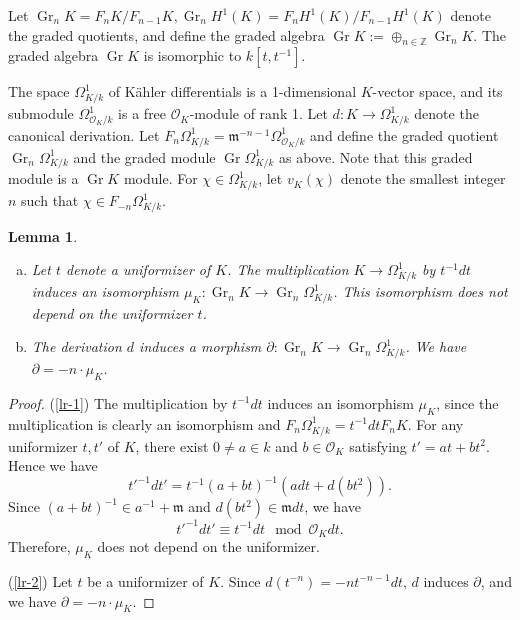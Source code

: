 \documentclass[10pt,a4paper]{amsart}
\numberwithin{equation}{section}
\newcommand{\Gr}{\operatorname{Gr}}
\theoremstyle{plain}
\newtheorem{lemm}[theo]{Lemma}
\theoremstyle{definition}
\begin{document}
Let $\Gr_nK=F_nK/F_{n-1}K,\Gr_nH^1(K)=F_nH^1(K)/F_{n-1}H^1(K)$ denote the graded quotients, and define the graded algebra $\Gr K:=\oplus_{n\in\mathbb{Z}}\Gr_nK$. The graded algebra $\Gr K$ is isomorphic to $k[t,t^{-1}]$.

The space $\Omega_{K/k}^1$ of K\"ahler differentials is a 1-dimensional $K$-vector space, and its submodule $\Omega_{\mathcal{O}_K/k}^1$ is a free $\mathcal{O}_K$-module of rank 1. Let $d:K\to\Omega_{K/k}^1$ denote the canonical derivation. Let $F_n\Omega_{K/k}^1=\mathfrak{m}^{-n-1}\Omega_{\mathcal{O}_K/k}^1$ and define the graded quotient $\Gr_n\Omega_{K/k}^1$ and the graded module $\Gr\Omega_{K/k}^1$ as above. Note that this graded module is a $\Gr K$ module. For $\chi\in \Omega_{K/k}^1$, let  $v_K(\chi)$ denote the smallest integer $n$ such that $\chi\in F_{-n}\Omega_{K/k}^1$.\\

\begin{lemm}\label{lr}
\begin{enumerate}[(a)]
 \item\label{lr-1} Let $t$ denote a uniformizer of $K$. The multiplication $K\to\Omega_{K/k}^1$ by $t^{-1}dt$ induces an isomorphism $\mu_{K}:\Gr_nK\to\Gr_n\Omega_{K/k}^1$. This isomorphism does not depend on the uniformizer $t$.
 \item\label{lr-2} The derivation $d$ induces a morphism $\partial:\Gr_nK\to\Gr_n\Omega_{K/k}^1$. We have $\partial=-n\cdot\mu_{K}$.
\end{enumerate}
\end{lemm}
\begin{proof} (\ref{lr-1}) The multiplication by $t^{-1}dt$ induces an isomorphism $\mu_{K}$, since the multiplication is clearly an isomorphism and $F_n\Omega_{K/k}^1=t^{-1}dtF_nK$. For any uniformizer $t,t'$ of $K$, there exist $0\neq a\in k$ and $b\in\mathcal{O}_K$ satisfying $t'=at+bt^2$. Hence we have
  \begin{equation}
  t'^{-1}dt'=t^{-1}(a+bt)^{-1}(adt+ d(bt^2)).
  \end{equation}
  Since $(a+bt)^{-1}\in a^{-1}+\mathfrak{m}$ and $d(bt^2)\in \mathfrak{m}dt$, we have
  \begin{equation}
t'^{-1}dt'\equiv t^{-1}dt \mod \mathcal{O}_Kdt.
\end{equation}
Therefore, $\mu_{K}$ does not depend on the uniformizer.

(\ref{lr-2})  Let $t$ be a uniformizer of $K$. Since $d(t^{-n})=-nt^{-n-1}dt$, $d$ induces $\partial$, and we have $\partial=-n\cdot\mu_{K}$.
\end{proof}
\end{document}
